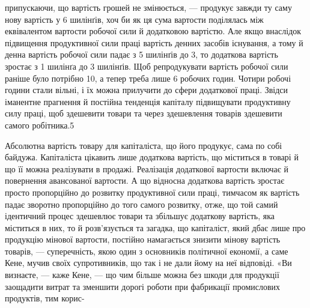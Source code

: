 \parcont{}  %
припускаючи, що вартість грошей не змінюється, — продукує
завжди ту саму нову вартість у 6 шилінґів, хоч би як ця сума
вартости поділялась між еквівалентом вартости робочої сили й
додатковою вартістю. Але якщо внаслідок підвищення продуктивної сили праці вартість денних засобів
існування, а тому й
денна вартість робочої сили падає з 5 шилінґів до 3, то додаткова
вартість зростає з 1 шилінґа до 3 шилінґів. Щоб репродукувати
вартість робочої сили раніше було потрібно 10, а тепер треба
лише 6 робочих годин. Чотири робочі години стали вільні, і їх
можна прилучити до сфери додаткової праці. Звідси іманентне
прагнення й постійна тенденція капіталу підвищувати продуктивну
силу праці, щоб здешевити товари та через здешевлення товарів
здешевити самого робітника.5

Абсолютна вартість товару для капіталіста, що його продукує, сама по собі байдужа. Капіталіста
цікавить лише додаткова
вартість, що міститься в товарі й що її можна реалізувати в продажі. Реалізація додаткової вартости
включає й повернення авансованої вартости. А що відносна додаткова вартість зростає просто
пропорційно до розвитку продуктивної сили праці, тимчасом як
вартість падає зворотно пропорційно до того самого розвитку,
отже, що той самий ідентичний процес здешевлює товари та збільшує додаткову вартість, яка міститься
в них, то й розв’язується
та загадка, що капіталіст, який дбає лише про продукцію мінової
вартости, постійно намагається знизити мінову вартість товарів, —
суперечність, якою один з основників політичної економії, а
саме Кене, мучив своїх супротивників, що так і не дали йому на
неї відповіді. «Ви визнаєте, — каже Кене, — що чим більше
можна без шкоди для продукції заощадити витрат та зменшити
дорогі роботи при фабрикації промислових продуктів, тим корис-

